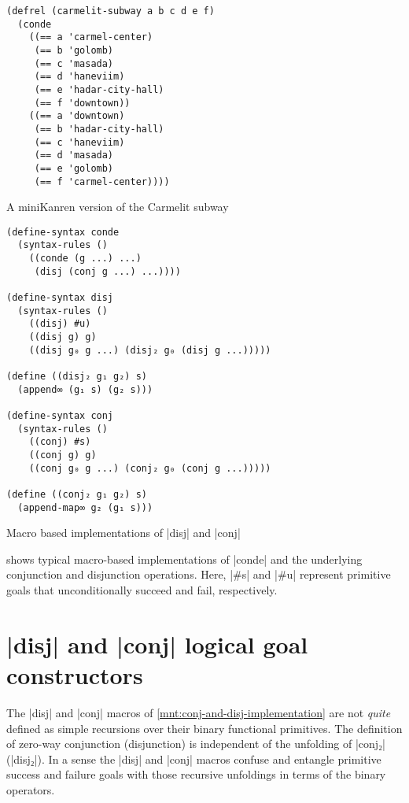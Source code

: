 \documentclass[sigplan,draft,natbib=false]{acmart}
\begin{document}
\begin{listing}
  \begin{verbatim}
(defrel (carmelit-subway a b c d e f)
  (conde
    ((== a 'carmel-center)
     (== b 'golomb)
     (== c 'masada)
     (== d 'haneviim)
     (== e 'hadar-city-hall)
     (== f 'downtown))
    ((== a 'downtown)
     (== b 'hadar-city-hall)
     (== c 'haneviim)
     (== d 'masada)
     (== e 'golomb)
     (== f 'carmel-center))))
  \end{verbatim}
  \caption{A miniKanren version of the Carmelit subway}
  \label{mnt:carmelit}
\end{listing}

\begin{listing}
  \begin{verbatim}
(define-syntax conde
  (syntax-rules ()
    ((conde (g ...) ...)
     (disj (conj g ...) ...))))

(define-syntax disj
  (syntax-rules ()
    ((disj) #u)
    ((disj g) g)
    ((disj g₀ g ...) (disj₂ g₀ (disj g ...)))))

(define ((disj₂ g₁ g₂) s)
  (append∞ (g₁ s) (g₂ s)))

(define-syntax conj
  (syntax-rules ()
    ((conj) #s)
    ((conj g) g)
    ((conj g₀ g ...) (conj₂ g₀ (conj g ...)))))

(define ((conj₂ g₁ g₂) s)
  (append-map∞ g₂ (g₁ s)))
  \end{verbatim}
  \caption{Macro based implementations of  \rackinline|disj| and \rackinline|conj|}
  \label{mnt:conj-and-disj-implementation}
\end{listing}

 shows typical macro-based
implementations of \rackinline|conde| and the underlying conjunction
and disjunction operations. Here, \rackinline|#s| and \rackinline|#u|
represent primitive goals that unconditionally succeed and fail,
respectively.

\section{\rackinline|disj| and \rackinline|conj| logical goal
  constructors}\label{sec:conde}

The  \rackinline|disj| and \rackinline|conj| macros of
\cref{mnt:conj-and-disj-implementation} are not \emph{quite} defined
as simple recursions over their binary functional primitives. The
definition of zero-way conjunction (disjunction) is independent of the
unfolding of \rackinline|conj₂| (\rackinline|disj₂|). In a sense the
\rackinline|disj| and \rackinline|conj| macros confuse and entangle
primitive success and failure goals with those recursive unfoldings in
terms of the binary operators.
\end{document}

